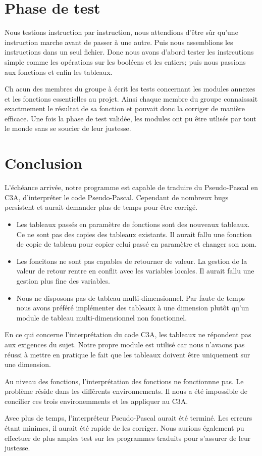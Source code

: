 \documentclass[10pt,a4paper]{article}
\begin{document}
\section{Phase de test}
Nous testions instruction par instruction, nous attendions d'être sûr qu'une instruction marche avant de passer à une autre. Puis nous assemblions les instructions dans un seul fichier. 
Donc nous avons d'abord tester les instrcutions simple comme les opérations sur les booléens et les entiers; puis nous passions aux fonctions et enfin les tableaux.

Ch	acun des membres du groupe à écrit les tests concernant les modules annexes et les fonctions essentielles au projet. Ainsi chaque membre du groupe connaissait exactmement le résultat de sa fonction et pouvait donc la corriger de manière efficace. Une fois la phase de test validée, les modules ont pu être utlisés par tout le monde sans se soucier de leur justesse.

\newpage
\section{Conclusion}

L'échéance arrivée, notre programme est capable de traduire du Pseudo-Pascal en C3A, d'interpréter le code Pseudo-Pascal. Cependant de nombreux bugs persistent et aurait demander plus de temps pour être corrigé.\\

\begin{itemize}
	\item Les tableaux passés en paramètre de fonctions sont des nouveaux tableaux. Ce ne sont pas des copies des tableaux existants. Il aurait fallu une fonction de copie de tableau pour copier celui passé en paramètre et changer son nom.
	\item Les foncitons ne sont pas capables de retourner de valeur. La gestion de la valeur de retour rentre en conflit avec les variables locales. Il aurait fallu une gestion plus fine des variables.
	\item Nous ne disposons pas de tableau multi-dimensionnel. Par faute de temps nous avons préféré implémenter des tableaux à une dimension plutôt qu'un module de tableau multi-dimensionnel non fonctionnel.\\
\end{itemize}

En ce qui concerne l'interprétation du code C3A, les tableaux ne répondent pas aux exigences du sujet. Notre propre module est utilisé car nous n'avaons pas réussi à mettre en pratique le fait que les tableaux doivent être uniquement sur une dimension.

Au niveau des fonctions, l'interprétation des fonctions ne fonctionnne pas. Le problème réside dans les différents environnements. Il nous a été impossible de concilier ces trois environemments et les appliquer au C3A.

Avec plus de temps, l'interpréteur Pseudo-Pascal aurait été terminé. Les erreurs étant minimes, il aurait été rapide de les corriger. Nous aurions également pu effectuer de plus amples test sur les programmes traduits pour s'assurer de leur justesse.  
\end{document}
